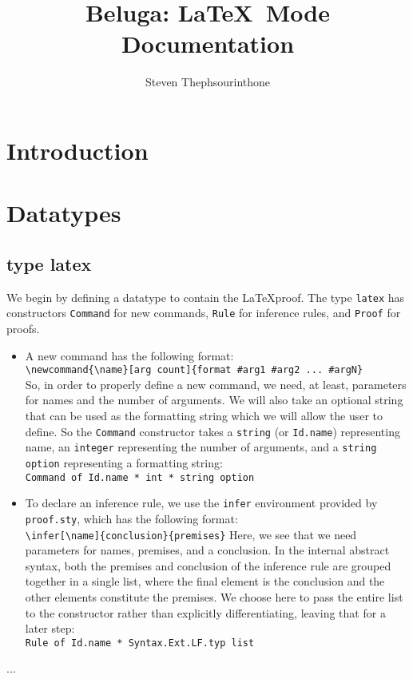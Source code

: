 \documentclass[11pt]{article}
\title{Beluga: \LaTeX\ Mode Documentation}
\author{Steven Thephsourinthone}
\begin{document}
\maketitle

\section{Introduction}

\section{Datatypes}
\subsection{type latex}
We begin by defining a datatype to contain the \LaTeX proof. The type \verb+latex+ has constructors \verb+Command+ for new commands, \verb+Rule+ for inference rules, and \verb+Proof+ for proofs.
\begin{itemize}
\item A new command has the following format:\\
\verb+\newcommand{\name}[arg count]{format #arg1 #arg2 ... #argN}+\\
So, in order to properly define a new command, we need, at least, parameters for names and the number of arguments. We will also take an optional string that can be used as the formatting string which we will allow the user to define. So the \verb+Command+ constructor takes a \verb+string+ (or \verb+Id.name+) representing name, an \verb+integer+ representing the number of arguments, and a \verb+string option+ representing a formatting string:\\ \verb+Command of Id.name * int * string option+
\item To declare an inference rule, we use the \verb+infer+ environment provided by \verb+proof.sty+, which has the following format:\\
\verb+\infer[\name]{conclusion}{premises}+
Here, we see that we need parameters for names, premises, and a conclusion. In the internal abstract syntax, both the premises and conclusion of the inference rule are grouped together in a single list, where the final element is the conclusion and the other elements constitute the premises. We choose here to pass the entire list to the constructor rather than explicitly differentiating, leaving that for a later step:\\ \verb+Rule of Id.name * Syntax.Ext.LF.typ list+
\end{itemize}
...
\end{document}
